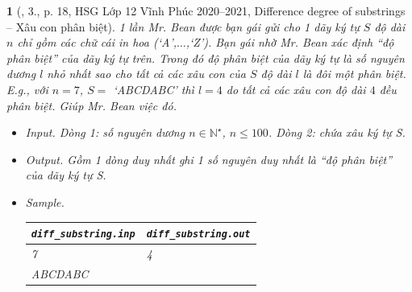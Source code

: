 \documentclass{article}
\newtheorem{baitoan}{}
\begin{document}
\begin{baitoan}[\cite{Trung_HSG_THPT_Tin}, 3., p. 18, HSG Lớp 12 Vĩnh Phúc 2020--2021, Difference degree of substrings -- Xâu con phân biệt]
	1 lần Mr. Bean được bạn gái gửi cho 1 dãy ký tự $S$ độ dài $n$ chỉ gồm các chữ cái in hoa (`A',$\ldots$,`Z'). Bạn gái nhờ Mr. Bean xác định ``độ phân biệt'' của dãy ký tự trên. Trong đó {\rm độ phân biệt} của dãy ký tự là số nguyên dương $l$ nhỏ nhất sao cho tất cả các xâu con của $S$ độ dài $l$ là đôi một phân biệt. E.g., với $n = 7$, $S =$ `ABCDABC' thì $l = 4$ do tất cả các xâu con độ dài $4$ đều phân biệt. Giúp Mr. Bean việc đó.
	\begin{itemize}
		\item {\sf Input.} Dòng 1: số nguyên dương $n\in\mathbb{N}^\star$, $n\le100$. Dòng 2: chứa xâu ký tự S.
		\item {\sf Output.} Gồm 1 dòng duy nhất ghi 1 số nguyên duy nhất là ``độ phân biệt'' của dãy ký tự S.
		\item {\sf Sample.}
		\begin{table}[H]
			\centering
			\begin{tabular}{|l|l|}
				\hline
				\verb|diff_substring.inp| & \verb|diff_substring.out| \\
				\hline
				7 & 4 \\
				ABCDABC &  \\
				\hline
			\end{tabular}
		\end{table}
	\end{itemize}
\end{baitoan}
\end{document}
